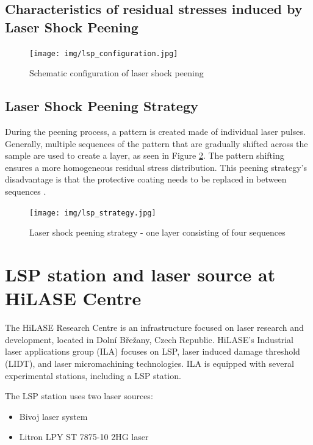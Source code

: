 \subsection{Characteristics of residual stresses induced by Laser Shock Peening}



\begin{figure}[h]
    \centering
    \texttt{[image: img/lsp\_configuration.jpg]}
    \caption{Schematic configuration of laser shock peening}
    \label{fig:lspconfiguration}
\end{figure}

\subsection{Laser Shock Peening Strategy}
During the peening process, a pattern is created made of individual laser pulses. Generally, multiple sequences of the pattern that are gradually shifted across the sample are used to create a layer, as seen in Figure \ref{fig:lspstrategy}. The pattern shifting ensures a more homogeneous residual stress distribution. This peening strategy's disadvantage is that the protective coating needs to be replaced in between sequences \cite{kaufman}.

\begin{figure}[h]
    \centering
    \texttt{[image: img/lsp\_strategy.jpg]}
    \caption{Laser shock peening strategy - one layer consisting of four sequences}
    \label{fig:lspstrategy}
\end{figure}

\section{LSP station and laser source at HiLASE Centre}

The HiLASE Research Centre is an infrastructure focused on laser research and development, located in Dolní Břežany, Czech Republic. HiLASE's Industrial laser applications group (ILA) focuses on LSP, laser induced damage threshold (LIDT), and laser micromachining technologies. ILA is equipped with several experimental stations, including a LSP station. 

The LSP station uses two laser sources:

\begin{itemize}
  \item Bivoj laser system
  \item Litron LPY ST 7875-10 2HG laser 
\end{itemize}

